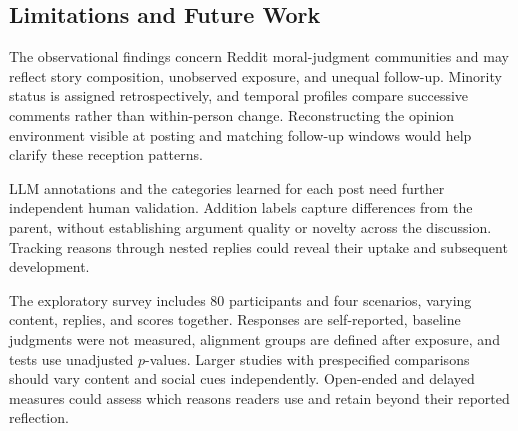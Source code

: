 \subsection{Limitations and Future Work}
\label{subsec:discussion-limitations}

The observational findings concern Reddit moral-judgment communities and
may reflect story composition, unobserved exposure, and unequal follow-up.
Minority status is assigned retrospectively, and temporal profiles compare
successive comments rather than within-person change. Reconstructing the
opinion environment visible at posting and matching follow-up windows would
help clarify these reception patterns.

LLM annotations and the categories learned for each post need further
independent human validation. Addition labels capture differences from the
parent, without establishing argument quality or novelty across the
discussion. Tracking reasons through nested replies could reveal their
uptake and subsequent development.

The exploratory survey includes $80$ participants and four scenarios,
varying content, replies, and scores together. Responses are self-reported,
baseline judgments were not measured, alignment groups are defined after
exposure, and tests use unadjusted $p$-values. Larger studies with
prespecified comparisons should vary content and social cues independently.
Open-ended and delayed measures could assess which reasons readers use
and retain beyond their reported reflection.